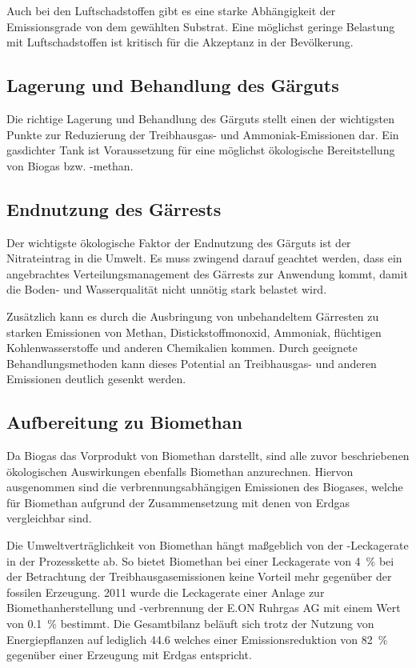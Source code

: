 Auch bei den Luftschadstoffen gibt es eine starke Abhängigkeit der Emissionsgrade von dem gewählten Substrat. Eine möglichst geringe Belastung mit Luftschadstoffen ist kritisch für die Akzeptanz in der Bevölkerung. \parencite{Paolini2018}

\subsection{Lagerung und Behandlung des Gärguts}\label{chap:digestate_storage}

Die richtige Lagerung und Behandlung des Gärguts stellt einen der wichtigsten Punkte zur Reduzierung der Treibhausgas- und Ammoniak-Emissionen dar. Ein gasdichter Tank ist Voraussetzung für eine möglichst ökologische Bereitstellung von Biogas bzw. -methan. \parencite{Paolini2018}


\subsection{Endnutzung des Gärrests}\label{chap:digestate_use}

Der wichtigste ökologische Faktor der Endnutzung des Gärguts ist der Nitrateintrag in die Umwelt. Es muss zwingend darauf geachtet werden, dass ein angebrachtes Verteilungsmanagement des Gärrests zur Anwendung kommt, damit die Boden- und Wasserqualität nicht unnötig stark belastet wird.\smallskip

Zusätzlich kann es durch die Ausbringung von unbehandeltem Gärresten zu starken Emissionen von Methan, Distickstoffmonoxid, Ammoniak, flüchtigen Kohlenwasserstoffe und anderen Chemikalien kommen. Durch geeignete Behandlungsmethoden kann dieses Potential an Treibhausgas- und anderen Emissionen deutlich gesenkt werden. \parencite{Paolini2018}


\subsection{Aufbereitung zu Biomethan}\label{chap:eco_biomethane}

Da Biogas das Vorprodukt von Biomethan darstellt, sind alle zuvor beschriebenen ökologischen Auswirkungen ebenfalls Biomethan anzurechnen. Hiervon ausgenommen sind die verbrennungsabhängigen Emissionen des Biogases, welche für Biomethan aufgrund der Zusammensetzung mit denen von Erdgas vergleichbar sind.\smallskip

Die Umweltverträglichkeit von Biomethan hängt maßgeblich von der -Leckagerate in der Prozesskette ab. So bietet Biomethan bei einer Leckagerate von \SI{4}{\percent} bei der Betrachtung der Treibhausgasemissionen keine Vorteil mehr gegenüber der fossilen Erzeugung. \SI{2011}{\relax} wurde die Leckagerate einer Anlage zur Biomethanherstellung und -verbrennung der E.ON Ruhrgas AG mit einem Wert von \SI{0.1}{\percent} bestimmt. Die Gesamtbilanz beläuft sich trotz der Nutzung von Energiepflanzen  auf lediglich \SI[per-mode=symbol]{44.6}{\gcoeqkwh} welches einer Emissionsreduktion von \SI{82}{\percent} gegenüber einer Erzeugung mit Erdgas entspricht. \parencite{Adelt2011} \parencite{Ravina2015} \smallskip

